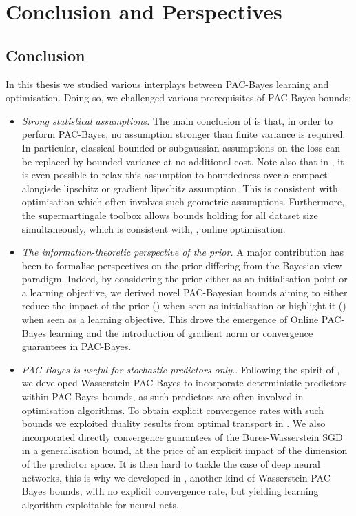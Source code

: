\chapter*{Conclusion and Perspectives}
\label{chap:conclu}

\section*{Conclusion}
In this thesis we studied various interplays between PAC-Bayes learning and optimisation. Doing so, we challenged various prerequisites of PAC-Bayes bounds:

\begin{itemize}
    \item \emph{Strong statistical assumptions.} The main conclusion of  is that, in order to perform PAC-Bayes, no assumption stronger than finite variance is required. In particular, classical bounded or subgaussian assumptions on the loss can be replaced by bounded variance at no additional cost. Note also that in , it is even possible to relax this assumption to boundedness over a compact alongisde lipschitz or gradient lipschitz assumption. This is consistent with  optimisation which often involves such geometric assumptions. Furthermore, the supermartingale toolbox allows bounds holding for all dataset size simultaneously, which is consistent with, \eg, online optimisation.
    \item \emph{The information-theoretic perspective of the prior.} A major contribution has been to formalise perspectives on the prior differing from the Bayesian view paradigm. Indeed, by considering the prior either as an initialisation point or a learning objective, we derived novel PAC-Bayesian bounds aiming to either reduce the impact of the prior () when seen as initialisation or highlight it () when seen as a learning objective. This drove the emergence of Online PAC-Bayes learning and the introduction of gradient norm or convergence guarantees in PAC-Bayes.
    \item \emph{ PAC-Bayes is useful for stochastic predictors only.}. Following the spirit of \citet{amit2022integral}, we developed Wasserstein PAC-Bayes to incorporate deterministic predictors within PAC-Bayes bounds, as such predictors are often involved in optimisation algorithms. To obtain explicit convergence rates with such bounds we exploited duality results from optimal transport in . We also incorporated directly convergence guarantees of the Bures-Wasserstein SGD in a generalisation bound, at the price of an explicit impact of the dimension of the predictor space. It is then hard to tackle the case of deep neural networks, this is why we developed in , another kind of Wasserstein PAC-Bayes bounds, with no explicit convergence rate, but yielding learning algorithm exploitable for neural nets.
\end{itemize}

